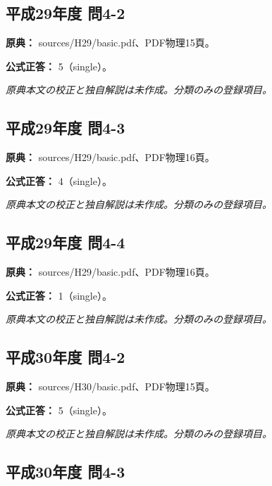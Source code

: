 \subsection{平成29年度 問4-2}
\label{q:h29-reg-basic-4-2}

\noindent\textbf{原典：} sources/H29/basic.pdf、PDF物理15頁。

\textbf{公式正答：} 5（single）。

\par\textit{原典本文の校正と独自解説は未作成。分類のみの登録項目。}

\subsection{平成29年度 問4-3}
\label{q:h29-reg-basic-4-3}

\noindent\textbf{原典：} sources/H29/basic.pdf、PDF物理16頁。

\textbf{公式正答：} 4（single）。

\par\textit{原典本文の校正と独自解説は未作成。分類のみの登録項目。}

\subsection{平成29年度 問4-4}
\label{q:h29-reg-basic-4-4}

\noindent\textbf{原典：} sources/H29/basic.pdf、PDF物理16頁。

\textbf{公式正答：} 1（single）。

\par\textit{原典本文の校正と独自解説は未作成。分類のみの登録項目。}

\subsection{平成30年度 問4-2}
\label{q:h30-reg-basic-4-2}

\noindent\textbf{原典：} sources/H30/basic.pdf、PDF物理15頁。

\textbf{公式正答：} 5（single）。

\par\textit{原典本文の校正と独自解説は未作成。分類のみの登録項目。}

\subsection{平成30年度 問4-3}
\label{q:h30-reg-basic-4-3}

